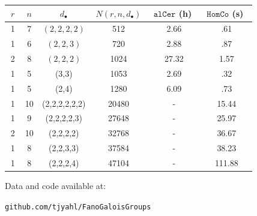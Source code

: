 \documentclass[final]{beamer}
\theoremstyle{thrm}
\newcommand{\tallminipage}{\begin{minipage}{.025\textwidth}~\vspace{0pt}~\end{minipage}}
\begin{document}
\begin{frame}
\begin{minipage}[t]{.3\textwidth}
\hspace{-.2cm}
\begin{minipage}{.99\textwidth}
\begin{table}[htb]
  \label{Big Fano}
  \def\arraystretch{1.2}
  \begin{tabular}{||c|c|c|c|c|c||}
    \hline
    $~r~$ & $~n~$ & $~d_\bullet~$ & $~N(r,n,d_\bullet)~$ & $~\texttt{alCer}$ (h)~ & $~\texttt{HomCo}$ (s)~\\
    \hline\hline
    1 & 7 & $(2,2,2,2)$ & 512 & 2.66 & .61\\
    \hline
    1 & 6 & $(2,2,3)$ & 720  & 2.88 & .87\\
    \hline
    2 & 8 & $(2,2,2)$ & 1024 & 27.32 & 1.57\\
    \hline
    1 & 5 & (3,3) & 1053 & 2.69 & .32\\
    \hline
    1 & 5 & (2,4) & 1280 & 6.09 & .73\\
    \hline
    1 & 10 & (2,2,2,2,2,2) & 20480 & - & 15.44\\
    \hline
    1 & 9 & (2,2,2,2,3) & 27648 & - & 25.97\\
    \hline
    2 & 10 & (2,2,2,2) & 32768 & - & 36.67\\
    \hline
    1 & 8 & (2,2,3,3) & 37584 & - & 38.23\\
    \hline
    1 & 8 & (2,2,2,4) & 47104 & - & 111.88\\
    \hline
  \end{tabular}
\end{table}
\end{minipage}

\vspace{.2cm}

Data and code available at:
\vspace{-.25cm}
\begin{center}
\texttt{github.com/tjyahl/FanoGaloisGroups}
\end{center}
\end{minipage}
%
\tallminipage

\end{frame}
\end{document}
